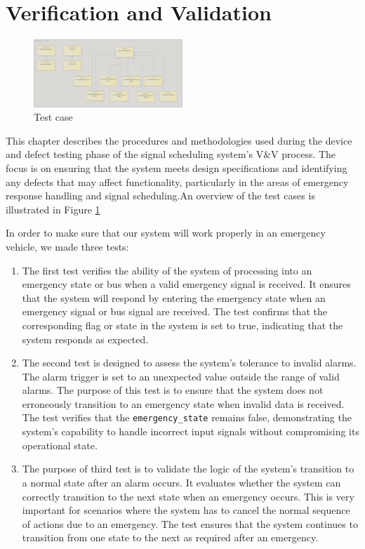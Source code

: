 \section{Verification and Validation}
\label{sec:test_case}

\begin{figure}[ht]
    \centering
    \includegraphics[width=0.5\textwidth]{images/test_case.png}
    \caption{Test case}
    \label{fig:picture1}
\end{figure}

This chapter describes the procedures and methodologies used during the device and defect testing phase of the signal scheduling system's V\&V process. The focus is on ensuring that the system meets design specifications and identifying any defects that may affect functionality, particularly in the areas of emergency response handling and signal scheduling.An overview of the test cases is illustrated in Figure \ref{fig:picture1}

In order to make sure that our system will work properly in an emergency vehicle, we made three tests:

\begin{enumerate}
    \item The first test verifies the ability of the system of processing into an emergency state or bus when a valid emergency signal is received. It ensures that the system will respond by entering the emergency state when an emergency signal or bus signal are received. The test confirms that the corresponding flag or state in the system is set to true, indicating that the system responds as expected.
    
    \item The second test is designed to assess the system's tolerance to invalid alarms. The alarm trigger is set to an unexpected value outside the range of valid alarms. The purpose of this test is to ensure that the system does not erroneously transition to an emergency state when invalid data is received. The test verifies that the \texttt{emergency\_state} remains false, demonstrating the system's capability to handle incorrect input signals without compromising its operational state.
    
    \item The purpose of third test is to validate the logic of the system's transition to a normal state after an alarm occurs. It evaluates whether the system can correctly transition to the next state when an emergency occurs. This is very important for scenarios where the system has to cancel the normal sequence of actions due to an emergency. The test ensures that the system continues to transition from one state to the next as required after an emergency.
\end{enumerate}

